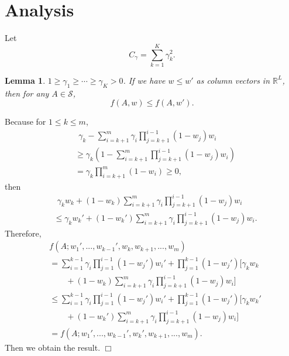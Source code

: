 \documentclass{article}
\newcommand{\cS}{\mathcal{S}}
\newcommand{\RR}{\mathbb{R}}
\newtheorem{lemma}[theorem]{Lemma}%
\newenvironment{proof}{\noindent {\textbf{Proof. }}}{$\Box$ \medskip}
\begin{document}
	
	\section{Analysis}
	Let
	\begin{equation}
	C_\gamma = \sum_{k=1}^{K} \gamma_k^2.
	\end{equation}
	
	\begin{lemma}
		\label{lem:increasing} 
		$1\geq \gamma_1\geq \cdots \geq \gamma_K > 0$. If we have $w \leq w'$ as column vectors in $\RR^L$, then for any $A\in\cS$,
		$$
		f(A, w) \leq f(A, w').
		$$
	\end{lemma}
	\begin{proof}
		Because for $1 \leq k \leq m$,
		\begin{align*}
		&~~\gamma_k - \sum_{i=k+1}^m \gamma_i\prod_{j=k+1}^{i-1}(1-w_j)w_i\\
		&\geq \gamma_k (1 - \sum_{i=k+1}^m \prod_{j=k+1}^{i-1}(1-w_j)w_i) \\
		&=\gamma_k \prod_{i=k+1}^{m}(1-w_i)\geq 0,
		\end{align*}
		then
		\begin{align*}
		&~~\gamma_k w_k + (1-w_k)\sum_{i=k+1}^m \gamma_i\prod_{j=k+1}^{i-1}(1-w_j)w_i\\
		& \leq \gamma_k w_k' + (1-w_k')\sum_{i=k+1}^m \gamma_i\prod_{j=k+1}^{i-1}(1-w_j)w_i.
		\end{align*}
		Therefore, 
		\begin{align*}
		& f(A; w_1',...,w_{k-1}',w_k,w_{k+1},...,w_m)\\
		&=\sum_{i=1}^{k-1} \gamma_i\prod_{j=1}^{i-1}(1-w_j')w_i' + \prod_{j=1}^{k-1}(1-w_j')[\gamma_k w_k \\
		&\qquad +(1-w_k)\sum_{i=k+1}^{m}\gamma_{i}\prod_{j=k+1}^{i-1}(1-w_j)w_i]\\
		&\leq \sum_{i=1}^{k-1} \gamma_i\prod_{j=1}^{i-1}(1-w_j')w_i' + \prod_{j=1}^{k-1}(1-w_j')[\gamma_k w_k' \\
		&\qquad +(1-w_k')\sum_{i=k+1}^{m}\gamma_{i}\prod_{j=k+1}^{i-1}(1-w_j)w_i]\\
		&=f(A; w_1',...,w_{k-1}',w_{k}',w_{k+1},...,w_m).
		\end{align*}
		Then we obtain the result.
	\end{proof}
	
\end{document}
